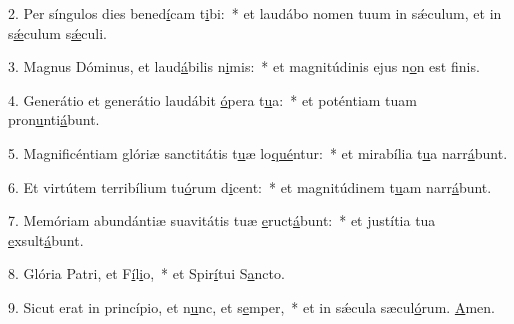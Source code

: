 2. Per síngulos dies bened\uline{í}cam t\uline{i}bi:~* et laudábo nomen tuum in sǽculum, et in s\uline{ǽ}culum s\uline{ǽ}culi.\par 
3. Magnus Dóminus, et laud\uline{á}bilis n\uline{i}mis:~* et magnitúdinis ejus n\uline{o}n est f\uline{i}nis.\par 
4. Generátio et generátio laudábit \uline{ó}pera t\uline{u}a:~* et poténtiam tuam pron\uline{u}nti\uline{á}bunt.\par 
5. Magnificéntiam glóriæ sanctitátis t\uline{u}æ lo\uline{qué}ntur:~* et mirabília t\uline{u}a narr\uline{á}bunt.\par 
6. Et virtútem terribílium tu\uline{ó}rum d\uline{i}cent:~* et magnitúdinem t\uline{u}am narr\uline{á}bunt.\par 
7. Memóriam abundántiæ suavitátis tuæ \uline{e}ruct\uline{á}bunt:~* et justítia tua \uline{e}xsult\uline{á}bunt.\par 
8. Glória Patri, et F\uline{í}l\uline{i}o,~* et Spir\uline{í}tui S\uline{a}ncto.\par 
9. Sicut erat in princípio, et n\uline{u}nc, et s\uline{e}mper,~* et in sǽcula sæcul\uline{ó}rum. \uline{A}men.\par 

